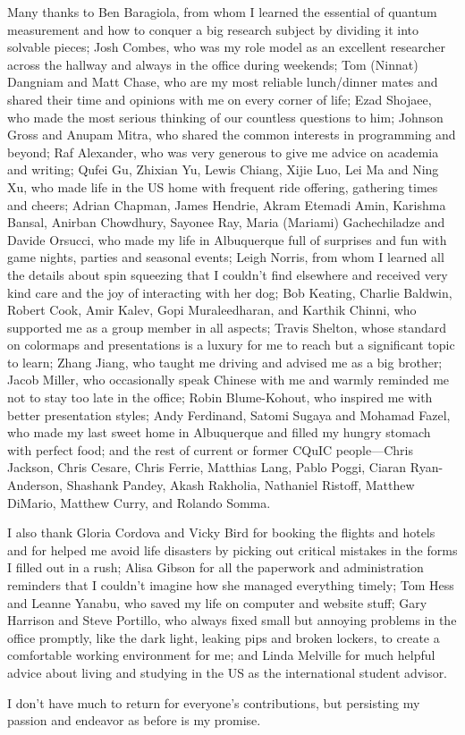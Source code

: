 \begin{acknowledgments}
Many thanks to Ben Baragiola, from whom I learned the essential of quantum measurement and how to conquer a big research subject by dividing it into solvable pieces; Josh Combes, who was my role model as an excellent researcher across the hallway and always in the office during weekends; Tom (Ninnat) Dangniam and Matt Chase, who are my most reliable lunch/dinner mates and shared their time and opinions with me on every corner of life; Ezad Shojaee, who made the most serious thinking of our countless questions to him; Johnson Gross and Anupam Mitra, who shared the common interests in programming and beyond; Raf Alexander, who was very generous to give me advice on academia and writing; Qufei Gu, Zhixian Yu, Lewis Chiang, Xijie Luo, Lei Ma and Ning Xu, who made life in the US home with frequent ride offering, gathering times and cheers; Adrian Chapman, James Hendrie, Akram Etemadi Amin, Karishma Bansal, Anirban Chowdhury, Sayonee Ray, Maria (Mariami) Gachechiladze and Davide Orsucci, who made my life in Albuquerque full of surprises and fun with game nights, parties and seasonal events; Leigh Norris, from whom I learned all the details about spin squeezing that I couldn't find elsewhere and received very kind care and the joy of interacting with her dog; Bob Keating, Charlie Baldwin, Robert Cook, Amir Kalev, Gopi Muraleedharan, and Karthik Chinni, who supported me as a group member in all aspects; Travis Shelton, whose standard on colormaps and presentations is a luxury for me to reach but a significant topic to learn; Zhang Jiang, who taught me driving and advised me as a big brother; Jacob Miller, who occasionally speak Chinese with me and warmly reminded me not to stay too late in the office; Robin Blume-Kohout, who inspired me with better presentation styles; Andy Ferdinand, Satomi Sugaya and Mohamad Fazel, who made my last sweet home in Albuquerque and filled my hungry stomach with perfect food; and the rest of current or former CQuIC people---Chris Jackson, Chris Cesare, Chris Ferrie, Matthias Lang, Pablo Poggi, Ciaran Ryan-Anderson, Shashank Pandey, Akash Rakholia, Nathaniel Ristoff, Matthew DiMario, Matthew Curry, and Rolando Somma.

I also thank Gloria Cordova and Vicky Bird for booking the flights and hotels and for helped me avoid life disasters by picking out critical mistakes in the forms I filled out in a rush; Alisa Gibson for all the paperwork and administration reminders that I couldn't imagine how she managed everything timely; Tom Hess and Leanne Yanabu, who saved my life on computer and website stuff; Gary Harrison and Steve Portillo, who always fixed small but annoying problems in the office promptly, like the dark light, leaking pips and broken lockers, to create a comfortable working environment for me; and Linda Melville for much helpful advice about living and studying in the \hbox{US} as the international student advisor.

I don't have much to return for everyone's contributions, but persisting my passion and endeavor as before is my promise.
\end{acknowledgments} 